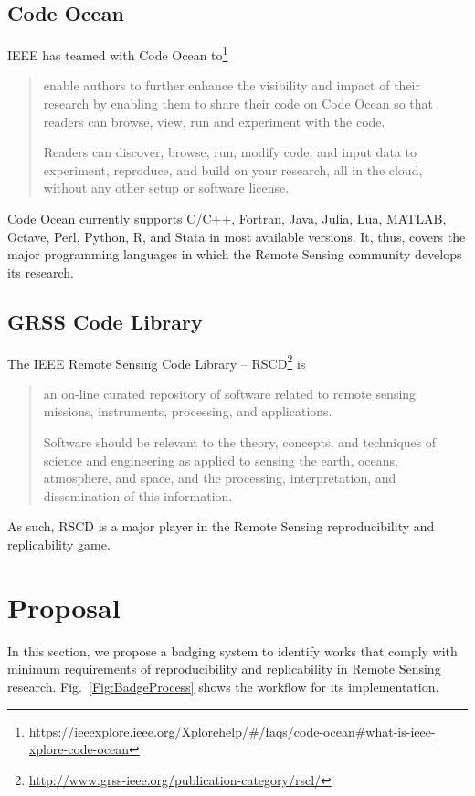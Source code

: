 \documentclass[journal,twoside]{IEEEtran}
\begin{document}
\subsection{Code Ocean}

IEEE has teamed with Code Ocean to\footnote{\url{https://ieeexplore.ieee.org/Xplorehelp/#/faqs/code-ocean#what-is-ieee-xplore-code-ocean}}
\begin{quote}
enable authors to further enhance the visibility and impact of their research by enabling them to share their code on Code Ocean so that readers can browse, view, run and experiment with the code.

Readers can discover, browse, run, modify code, and input data to experiment, reproduce, and build on your research, all in the cloud, without any other setup or software license.
\end{quote}

Code Ocean currently supports 
C/C++, 
Fortran,
Java,
Julia,
Lua,
MATLAB,
Octave,
Perl,
Python,
R, and
Stata in most available versions.
It, thus, covers the major programming languages in which the Remote Sensing community develops its research.

\subsection{GRSS Code Library}

The IEEE Remote Sensing Code Library -- RSCD\footnote{\url{http://www.grss-ieee.org/publication-category/rscl/}} is 
\begin{quote}
an on-line curated repository of software related to remote sensing missions, instruments, processing, and applications.

Software should be relevant to the theory, concepts, and techniques of science and engineering as applied to sensing the earth, oceans, atmosphere, and space, and the processing, interpretation, and dissemination of this information.
\end{quote}

As such, RSCD is a major player in the Remote Sensing reproducibility and replicability game.

\section{Proposal}

In this section, we propose a badging system to identify works that comply with minimum requirements of reproducibility and replicability in Remote Sensing research.
Fig.~\ref{Fig:BadgeProcess} shows the workflow for its implementation.
\end{document}
